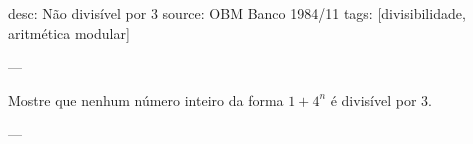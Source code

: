desc: Não divisível por $3$
source:  OBM Banco 1984/11
tags:  [divisibilidade, aritmética modular]

---

Mostre que nenhum número inteiro da forma $1 + 4^n$ é divisível por $3$.

---

